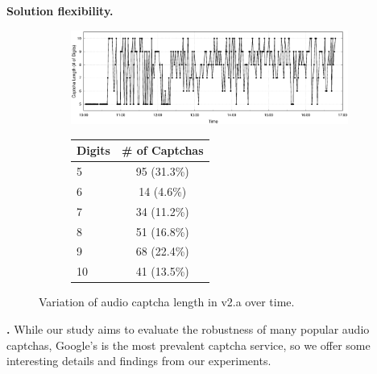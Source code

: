 

\textbf{Solution flexibility.} 

\begin{figure}[t]
\begin{subfigure}{0.75\textwidth}
    \centering
    \includegraphics[width=1\textwidth]{figures/captcha_length.eps}
    \label{fig:length_time}
\end{subfigure} %
\begin{subfigure}{0.2\textwidth}
    \centering
    \label{tab:length}
    \begin{tabular}{lc}
    \toprule
    \textbf{Digits} & \textbf{\# of Captchas} \\
    \hline
    5 & 95 (31.3\%) \\
    \rowcolor{Gray} 
    6 & 14 (4.6\%) \\
    7 & 34 (11.2\%) \\
    \rowcolor{Gray} 
    8 & 51 (16.8\%) \\
    9 & 68 (22.4\%) \\
    \rowcolor{Gray} 
    10 & 41 (13.5\%)\\
    \bottomrule
    \end{tabular}
\end{subfigure}
\caption{Variation of audio captcha length in \re v2.a over time.}
\label{fig:length}
\end{figure}

\textbf{\re.} While our study aims to evaluate the robustness of many popular audio captchas, 
Google's \re is the most prevalent captcha service, so we offer some interesting details 
and findings from our experiments.

